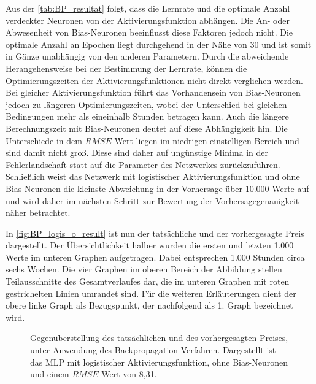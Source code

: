 Aus der \autoref{tab:BP_resultat} folgt, dass die Lernrate und die optimale Anzahl verdeckter Neuronen von der Aktivierungsfunktion abhängen. Die An- oder Abwesenheit von Bias-Neuronen beeinflusst diese Faktoren jedoch nicht. Die optimale Anzahl an Epochen liegt durchgehend in der Nähe von 30 und ist somit in Gänze unabhängig von den anderen Parametern. Durch die abweichende Herangehensweise bei der Bestimmung der Lernrate, können die Optimierungszeiten der Aktivierungsfunktionen nicht direkt verglichen werden. Bei gleicher Aktivierungsfunktion führt das Vorhandensein von Bias-Neuronen jedoch zu längeren Optimierungszeiten, wobei der Unterschied bei gleichen Bedingungen mehr als eineinhalb Stunden betragen kann. Auch die längere Berechnungszeit mit Bias-Neuronen deutet auf diese Abhängigkeit hin. Die Unterschiede in dem $RMSE$-Wert liegen im niedrigen einstelligen Bereich und sind damit nicht groß. Diese sind daher auf ungünstige Minima in der Fehlerlandschaft statt auf die Parameter des Netzwerkes zurückzuführen. Schließlich weist das Netzwerk mit logistischer Aktivierungsfunktion und ohne Bias-Neuronen die kleinste Abweichung in der Vorhersage über 10.000 Werte auf und wird daher im nächsten Schritt zur Bewertung der Vorhersagegenauigkeit näher betrachtet.

In \autoref{fig:BP_logis_o_result} ist nun der tatsächliche und der vorhergesagte Preis dargestellt. Der Übersichtlichkeit halber wurden die ersten und letzten 1.000 Werte im unteren Graphen aufgetragen. Dabei entsprechen 1.000 Stunden circa sechs Wochen. Die vier Graphen im oberen Bereich der Abbildung stellen Teilausschnitte des Gesamtverlaufes dar, die im unteren Graphen mit roten gestrichelten Linien umrandet sind. Für die weiteren Erläuterungen dient der obere linke Graph als Bezugspunkt, der nachfolgend als 1. Graph bezeichnet wird.



\begin{figure}[!htb]
    \centering
        
    \caption[Gegenüberstellung des tatsächlichen und des vorhergesagten Preises beim BP]{Gegenüberstellung des tatsächlichen und des vorhergesagten Preises, unter Anwendung des Backpropagation-Verfahren. Dargestellt ist das MLP mit logistischer Aktivierungsfunktion, ohne Bias-Neuronen und einem $RMSE$-Wert von 8,31.}
    \label{fig:BP_logis_o_result}
\end{figure}

